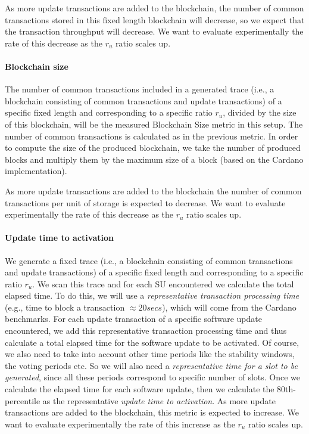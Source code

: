 As more update transactions are added to the blockchain, the number of common
transactions stored in this fixed length blockchain will
decrease, %
so we expect that the transaction throughput will decrease. We want to evaluate
experimentally the rate of this decrease as the $r_u$ ratio scales up.

\paragraph{Blockchain size}
The number of common transactions included in a generated trace (i.e., a
blockchain consisting of common transactions and update transactions) of a
specific fixed length and corresponding to a specific ratio $r_u$, divided by
the size of this blockchain, will be the measured Blockchain Size metric in this
setup. The number of common transactions is calculated as in the previous
metric. In order to compute the size of the produced blockchain, we take the
number of produced blocks and multiply them by the maximum size of a block
(based on the Cardano implementation).

As more update transactions are added to the blockchain the number of common
transactions per unit of storage is expected to decrease. We want to evaluate
experimentally the rate of this decrease as the $r_u$ ratio scales up.

\paragraph{Update time to activation}
We generate a fixed trace (i.e., a blockchain consisting of common transactions
and update transactions) of a specific fixed length and corresponding to a
specific ratio $r_u$. We scan this trace and for each SU encountered we
calculate the total elapsed time. To do this, we will use a \emph{representative
  transaction processing time} (e.g., time to block a transaction
$\approx 20 secs$), which will come from the Cardano benchmarks. For each update
transaction of a specific software update encountered, we add this
representative transaction processing time and thus calculate a total elapsed
time for the software update to be activated. Of course, we also need to take
into account other time periods like the stability windows, the voting periods
etc. So we will also need a \emph{representative time for a slot to be
  generated}, since all these periods correspond to specific number of slots.
Once we calculate the elapsed time for each software update, then we calculate
the 80th-percentile as the representative \emph{update time to activation}. As
more update transactions are added to the blockchain, this metric is expected to
increase. We want to evaluate experimentally the rate of this increase as the
$r_u$ ratio scales up.

